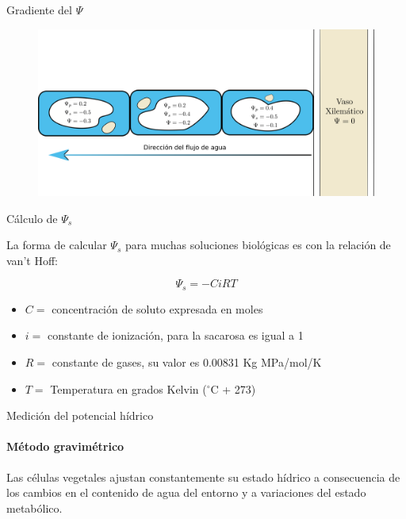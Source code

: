 \documentclass[12pt, aspectratio=169]{beamer}
\begin{document}
	\begin{frame}{Gradiente del $\Psi$}
		
		\begin{figure}
			\includegraphics[width=\textwidth]{Gradiente_potencial}
			\centering
			\label{fig:gradiente}
		\end{figure}
		
	\end{frame}

	\begin{frame}{C\'alculo  de $\Psi_s$}
		
		La forma de calcular $\Psi_s$ para muchas soluciones biol\'ogicas es con la relaci\'on de van't Hoff:
		
		$$ \Psi_s = -C i R T$$
		
		\begin{itemize}
			\item $C = $ concentraci\'on de soluto expresada en moles
			\item $i = $ constante de ionizaci\'on, para la sacarosa es igual a 1
			\item $R = $ constante de gases, su valor es 0.00831 Kg MPa/mol/K
			\item $T = $ Temperatura en grados Kelvin ($^\circ$C + 273) 
		\end{itemize}
		
	\end{frame}

	\begin{frame}{Medici\'on del potencial h\'idrico}
		\framesubtitle{M\'etodo gravim\'etrico}
		Las c\'elulas vegetales ajustan constantemente su estado h\'idrico a consecuencia de los cambios en el contenido de agua del entorno y a variaciones del estado metab\'olico.
	\end{frame}
\end{document}
